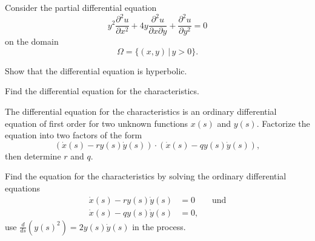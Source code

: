 Consider the partial differential equation
\[
y^2\frac{\partial^2 u}{\partial x^2}
+4y\frac{\partial^2u}{\partial x\partial y}
+\frac{\partial^2 u}{\partial y^2}=0
\]
on the domain
\[
\Omega = \{ (x,y)\,|\, y >0\}.
\]
\begin{teilaufgaben}
\item
Show that the differential equation is hyperbolic.
\item
Find the differential equation for the characteristics.
\item
The differential equation for the characteristics is an ordinary
differential equation of first order for two unknown functions
$x(s)$ and $y(s)$.
Factorize the equation into two factors of the form
\[
(\dot x(s)-ry(s)\dot y(s))\cdot (\dot x(s)-qy(s)\dot y(s)),
\]
then determine $r$ and $q$.
\item
Find the equation for the characteristics by solving the ordinary
differential equations
\begin{align*}
\dot x(s) - ry(s)\dot y(s)&=0\qquad\text{und}\\
\dot x(s) - qy(s)\dot y(s)&=0,
\end{align*}
use 
$\frac{d}{ds}(y(s)^2)=2y(s)\dot y(s)$
in the process.
\end{teilaufgaben}

